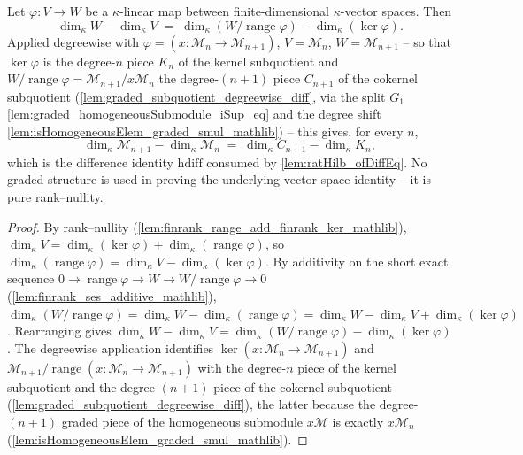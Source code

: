 \begin{lemma}
  \label{lem:graded_degreewise_finrank_diff}
  Let \(\varphi : V \to W\) be a \(\kappa\)-linear map between finite-dimensional
  \(\kappa\)-vector spaces. Then
  \[
    \dim_\kappa W - \dim_\kappa V
      \;=\; \dim_\kappa(W/\operatorname{range}\varphi) - \dim_\kappa(\ker\varphi).
  \]
  Applied degreewise with \(\varphi = (x : \mathcal{M}_n \to \mathcal{M}_{n+1})\),
  \(V = \mathcal{M}_n\), \(W = \mathcal{M}_{n+1}\) -- so that \(\ker\varphi\) is the
  degree-\(n\) piece \(K_n\) of the kernel subquotient and
  \(W/\operatorname{range}\varphi = \mathcal{M}_{n+1}/x \mathcal{M}_n\) the
  degree-\((n+1)\) piece \(C_{n+1}\) of the cokernel subquotient
  (\cref{lem:graded_subquotient_degreewise_diff}, via the split \(G_1\)
  \cref{lem:graded_homogeneousSubmodule_iSup_eq} and the degree shift
  \cref{lem:isHomogeneousElem_graded_smul_mathlib}) -- this gives, for every \(n\),
  \[
    \dim_\kappa \mathcal{M}_{n+1} - \dim_\kappa \mathcal{M}_n
      \;=\; \dim_\kappa C_{n+1} - \dim_\kappa K_n,
  \]
  which is the difference identity \(\mathrm{hdiff}\) consumed by
  \cref{lem:ratHilb_ofDiffEq}. No graded structure is used in proving the
  underlying vector-space identity -- it is pure rank--nullity.
\end{lemma}

\begin{proof}
    \leanok
  By rank--nullity (\cref{lem:finrank_range_add_finrank_ker_mathlib}),
  \(\dim_\kappa V = \dim_\kappa(\ker\varphi) + \dim_\kappa(\operatorname{range}
  \varphi)\), so \(\dim_\kappa(\operatorname{range}\varphi) = \dim_\kappa V -
  \dim_\kappa(\ker\varphi)\). By additivity on the short exact sequence
  \(0 \to \operatorname{range}\varphi \to W \to W/\operatorname{range}\varphi \to 0\)
  (\cref{lem:finrank_ses_additive_mathlib}),
  \(\dim_\kappa(W/\operatorname{range}\varphi) = \dim_\kappa W -
  \dim_\kappa(\operatorname{range}\varphi) = \dim_\kappa W - \dim_\kappa V +
  \dim_\kappa(\ker\varphi)\). Rearranging gives
  \(\dim_\kappa W - \dim_\kappa V = \dim_\kappa(W/\operatorname{range}\varphi) -
  \dim_\kappa(\ker\varphi)\). The degreewise application identifies
  \(\ker(x : \mathcal{M}_n \to \mathcal{M}_{n+1})\) and
  \(\mathcal{M}_{n+1}/\operatorname{range}(x : \mathcal{M}_n \to \mathcal{M}_{n+1})\)
  with the degree-\(n\) piece of the kernel subquotient and the degree-\((n+1)\)
  piece of the cokernel subquotient (\cref{lem:graded_subquotient_degreewise_diff}),
  the latter because the degree-\((n+1)\) graded piece of the homogeneous submodule
  \(x\mathcal{M}\) is exactly \(x \mathcal{M}_n\)
  (\cref{lem:isHomogeneousElem_graded_smul_mathlib}).
\end{proof}

